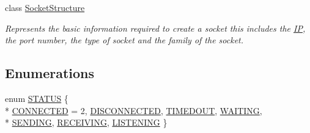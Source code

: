 \begin{DoxyCompactItemize}
class \hyperlink{class_communication_1_1_socket_structure}{Socket\+Structure}
\begin{DoxyCompactList}\small\item\em Represents the basic information required to create a socket this includes the \hyperlink{class_communication_1_1_i_p}{I\+P}, the port number, the type of socket and the family of the socket. \end{DoxyCompactList}\end{DoxyCompactItemize}
\subsection*{Enumerations}
\begin{DoxyCompactItemize}
\item 
enum \hyperlink{namespace_communication_a8dc059cf785da5e0d245141c4f8a6a9c}{S\+T\+A\+T\+U\+S} \{ \\*
\hyperlink{namespace_communication_a8dc059cf785da5e0d245141c4f8a6a9caf611ac04ecd346bb4f0a99f937c8be27}{C\+O\+N\+N\+E\+C\+T\+E\+D} = 2, 
\hyperlink{namespace_communication_a8dc059cf785da5e0d245141c4f8a6a9caf242c3fbc74341b68b1b7b7b619da105}{D\+I\+S\+C\+O\+N\+N\+E\+C\+T\+E\+D}, 
\hyperlink{namespace_communication_a8dc059cf785da5e0d245141c4f8a6a9cad238572b7d4e530cc8355ff9e13859b6}{T\+I\+M\+E\+D\+O\+U\+T}, 
\hyperlink{namespace_communication_a8dc059cf785da5e0d245141c4f8a6a9ca6fc54d879351bc5dfb505ddf8e267c55}{W\+A\+I\+T\+I\+N\+G}, 
\\*
\hyperlink{namespace_communication_a8dc059cf785da5e0d245141c4f8a6a9caf11a62bd838847a6529a8294181c3d80}{S\+E\+N\+D\+I\+N\+G}, 
\hyperlink{namespace_communication_a8dc059cf785da5e0d245141c4f8a6a9ca1f52bcd9f0d69f721351ec7a16fa88ef}{R\+E\+C\+E\+I\+V\+I\+N\+G}, 
\hyperlink{namespace_communication_a8dc059cf785da5e0d245141c4f8a6a9ca066254e4f09ee3441aff52e662adbf21}{L\+I\+S\+T\+E\+N\+I\+N\+G}
 \}
\end{DoxyCompactItemize}
